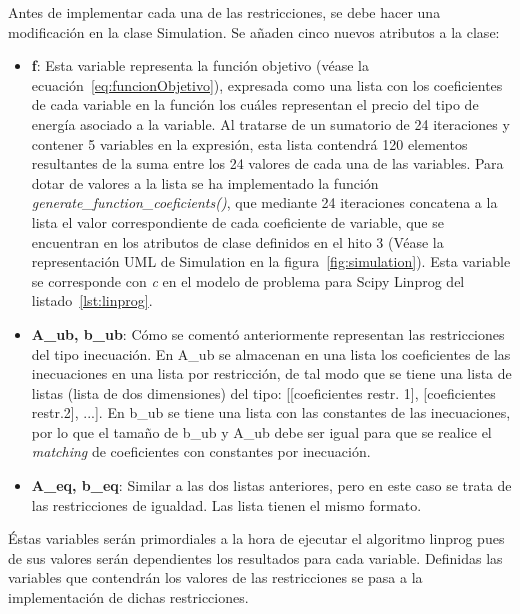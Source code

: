 Antes de implementar cada una de las restricciones, se debe hacer una modificación en la clase Simulation. Se añaden cinco nuevos atributos a la clase:
\begin{itemize}
\item \textbf{f}: Esta variable representa la función objetivo (véase la ecuación~\ref{eq:funcionObjetivo}), expresada como una lista con los coeficientes de cada variable en la función los cuáles representan el precio del tipo de energía asociado a la variable. Al tratarse de un sumatorio de 24 iteraciones y contener 5 variables en la expresión, esta lista contendrá 120 elementos resultantes de la suma entre los 24 valores de cada una de las variables. Para dotar de valores a la lista se ha implementado la función \textit{generate\_function\_coeficients()}, que mediante 24 iteraciones concatena a la lista el valor correspondiente de cada coeficiente de variable, que se encuentran en los atributos de clase definidos en el hito 3 (Véase la representación UML de Simulation en la figura~\ref{fig:simulation}). Esta variable se corresponde con \textit{c} en el modelo de problema para Scipy Linprog del listado~\ref{lst:linprog}.
\item \textbf{A\_ub, b\_ub}: Cómo se comentó anteriormente representan las restricciones del tipo inecuación. En A\_ub se almacenan en una lista los coeficientes de las inecuaciones en una lista por restricción, de tal modo que se tiene una lista de listas (lista de dos dimensiones) del tipo: [[coeficientes restr. 1], [coeficientes restr.2], ...]. En b\_ub se tiene una lista con las constantes de las inecuaciones, por lo que el tamaño de b\_ub y A\_ub debe ser igual para que se realice el \textit{matching} de coeficientes con constantes por inecuación.
\item \textbf{A\_eq, b\_eq}: Similar a las dos listas anteriores, pero en este caso se trata de las restricciones de igualdad. Las lista tienen el mismo formato.
\end{itemize}
Éstas variables serán primordiales a la hora de ejecutar el algoritmo linprog pues de sus valores serán dependientes los resultados para cada variable. Definidas las variables que contendrán los valores de las restricciones se pasa a la implementación de dichas restricciones.

